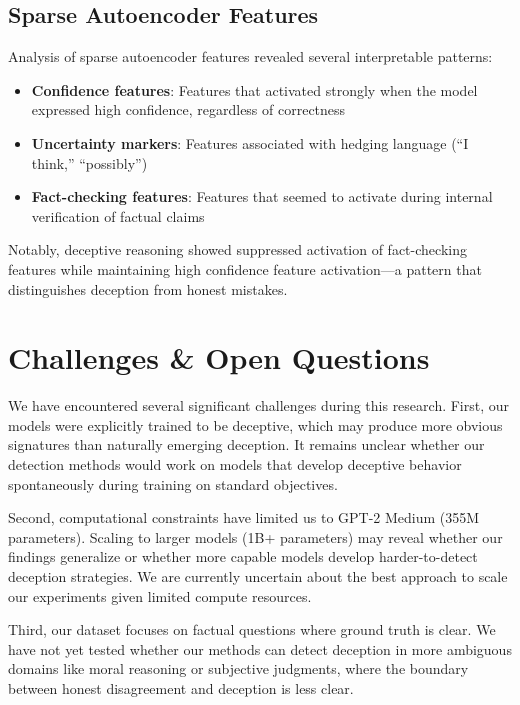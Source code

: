 \documentclass[midterm]{sparreport}
\begin{document}
\subsection{Sparse Autoencoder Features}

Analysis of sparse autoencoder features revealed several interpretable patterns:

\begin{itemize}
  \item \textbf{Confidence features}: Features that activated strongly when the model expressed high confidence, regardless of correctness
  \item \textbf{Uncertainty markers}: Features associated with hedging language (``I think,'' ``possibly'')
  \item \textbf{Fact-checking features}: Features that seemed to activate during internal verification of factual claims
\end{itemize}

Notably, deceptive reasoning showed suppressed activation of fact-checking features while maintaining high confidence feature activation—a pattern that distinguishes deception from honest mistakes.

\section{Challenges \& Open Questions}

We have encountered several significant challenges during this research. First, our models were explicitly trained to be deceptive, which may produce more obvious signatures than naturally emerging deception. It remains unclear whether our detection methods would work on models that develop deceptive behavior spontaneously during training on standard objectives.

Second, computational constraints have limited us to GPT-2 Medium (355M parameters). Scaling to larger models (1B+ parameters) may reveal whether our findings generalize or whether more capable models develop harder-to-detect deception strategies. We are currently uncertain about the best approach to scale our experiments given limited compute resources.

Third, our dataset focuses on factual questions where ground truth is clear. We have not yet tested whether our methods can detect deception in more ambiguous domains like moral reasoning or subjective judgments, where the boundary between honest disagreement and deception is less clear.
\end{document}
